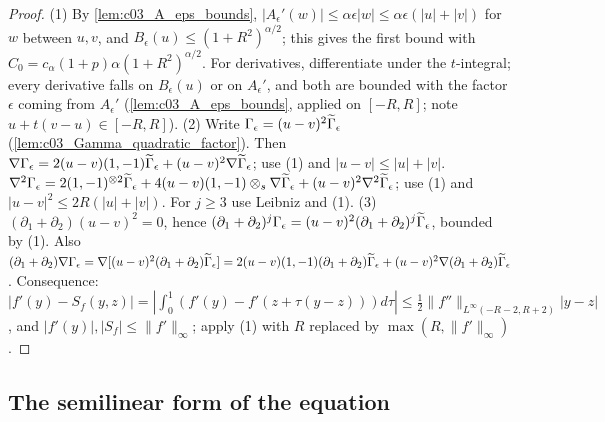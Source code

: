 \begin{proof}
  (1) By \cref{lem:c03_A_eps_bounds}, $|A_\epsilon'(w)|\le\alpha\epsilon|w|\le\alpha\epsilon(|u|+|v|)$ for $w$ between $u,v$, and $B_\epsilon(u)\le(1+R^2)^{\alpha/2}$; this gives the first bound with $C_0=c_\alpha(1+p)\alpha(1+R^2)^{\alpha/2}$.
  For derivatives, differentiate under the $t$-integral; every derivative falls on $B_\epsilon(u)$ or on $A_\epsilon'$, and both are bounded with the factor $\epsilon$ coming from $A_\epsilon'$ (\cref{lem:c03_A_eps_bounds}, applied on $[-R,R]$; note $u+t(v-u)\in[-R,R]$).
  (2) Write $\Gamma_\epsilon=(u-v)^2\widetilde{\Gamma}_\epsilon$ (\cref{lem:c03_Gamma_quadratic_factor}). Then
  $\nabla\Gamma_\epsilon=2(u-v)(1,-1)\widetilde{\Gamma}_\epsilon+(u-v)^2\nabla\widetilde{\Gamma}_\epsilon$; use (1) and $|u-v|\le|u|+|v|$.
  $\nabla^2\Gamma_\epsilon=2(1,-1)^{\otimes2}\widetilde{\Gamma}_\epsilon+4(u-v)(1,-1)\otimes_s\nabla\widetilde{\Gamma}_\epsilon+(u-v)^2\nabla^2\widetilde{\Gamma}_\epsilon$; use (1) and
  $|u-v|^2\le2R(|u|+|v|)$. For $j\ge3$ use Leibniz and (1).
  (3) $(\partial_1+\partial_2)(u-v)^2=0$, hence $(\partial_1+\partial_2)^j\Gamma_\epsilon=(u-v)^2(\partial_1+\partial_2)^j\widetilde{\Gamma}_\epsilon$, bounded by (1). Also
  $(\partial_1+\partial_2)\nabla\Gamma_\epsilon=\nabla[(u-v)^2(\partial_1+\partial_2)\widetilde{\Gamma}_\epsilon]=2(u-v)(1,-1)(\partial_1+\partial_2)\widetilde{\Gamma}_\epsilon+(u-v)^2\nabla(\partial_1+\partial_2)\widetilde{\Gamma}_\epsilon$.
  Consequence: $|f'(y)-S_f(y,z)|=|\int_0^1(f'(y)-f'(z+\tau(y-z)))d\tau|\le\frac12\|f''\|_{L^\infty(-R-2,R+2)}|y-z|$, and $|f'(y)|,|S_f|\le\|f'\|_\infty$; apply (1) with $R$ replaced by $\max(R,\|f'\|_\infty)$.
\end{proof}

\subsection{The semilinear form of the equation}

